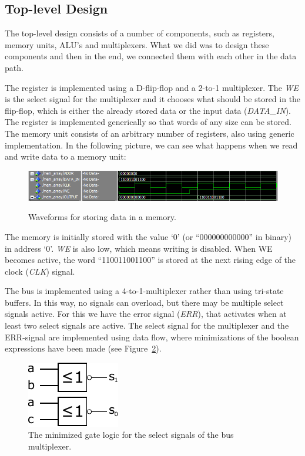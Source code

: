 \documentclass[a4,11pt]{article}
\begin{document}
\newpage

\subsection{Top-level Design}

The top-level design consists of a number of components, such as registers, memory units, ALU's
and multiplexers. What we did was to design these components and then in the end, we connected
them with each other in the data path.

The register is implemented using a D-flip-flop and a 2-to-1 multiplexer. The {\it WE} is the select
signal for the multiplexer and it chooses what should be stored in the flip-flop, which is either
the already stored data or the input data ({\it DATA\_IN}). The register is implemented
generically so that words of any size can be stored. The memory unit consists of an arbitrary number
of registers, also using generic implementation. In the following picture, we can see what happens
when we read and write data to a memory unit:

\begin{figure}[h!]
	\centering
	\includegraphics[width=1\textwidth]{Figurer/data_memory.PNG}
	\label{fig:sim}
  \caption{Waveforms for storing data in a memory.}
\end{figure}

The memory is initially stored with the value `0' (or ``000000000000'' in binary) in address `0'.
{\it WE} is also low, which means writing is disabled. When WE becomes active, the word
``110011001100'' is stored at the next rising edge of the clock ({\it CLK}) signal.

The bus is implemented using a 4-to-1-multiplexer rather than using tri-state buffers. In this
way, no signals can overload, but there may be multiple select signals active. For this we have
the error signal ({\it ERR}), that activates when at least two select signals are active. The
select signal for the multiplexer and the ERR-signal are implemented using data flow, where
minimizations of the boolean expressions have been made (see Figure~\ref{fig:enc}).

\begin{figure}[h!]
	\centering
	\includegraphics[width=.3\textwidth]{Figurer/enc4b}
	\caption{The minimized gate logic for the select signals of the bus multiplexer.}
	\label{fig:enc}
\end{figure}
\end{document}
